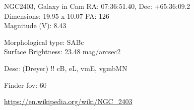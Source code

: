 \begin{block}{NGC2403, Galaxy in Cam}
    RA: 07:36:51.40, Dec: +65:36:09.2 \\ 
    Dimensions: 19.95 x 10.07 PA: 126 \\ 
    Magnitude (V): 8.43

    Morphological type: SABc \\ 
    Surface Brightness: 23.48 mag/arcsec2 

    Desc: (Dreyer) !! cB, eL, vmE, vgmbMN 

    Finder fov: 60 

    \url{https://en.wikipedia.org/wiki/NGC_2403} 
\end{block}